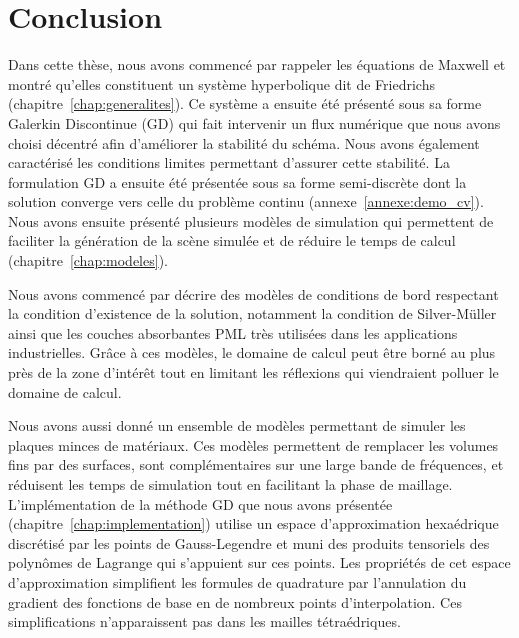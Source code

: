 \chapter*{Conclusion}


Dans cette thèse, nous avons commencé par rappeler
les équations de Maxwell et montré qu’elles constituent un système
hyperbolique dit de Friedrichs (chapitre~\ref{chap:generalites}).
Ce système a ensuite été présenté sous sa forme Galerkin Discontinue (GD)
qui fait intervenir un flux numérique que nous avons choisi décentré
afin d'améliorer la stabilité du schéma.
Nous avons également caractérisé les
conditions limites permettant d’assurer cette stabilité.
La formulation GD a ensuite été présentée sous sa forme semi-discrète
dont la solution converge vers celle du problème continu (annexe~\ref{annexe:demo_cv}).
\\

Nous avons ensuite présenté plusieurs modèles de simulation
qui permettent de faciliter la génération de la scène simulée
et de réduire le temps de calcul (chapitre~\ref{chap:modeles}).

Nous avons commencé par décrire des modèles de conditions de bord
respectant la condition d'existence de la solution, notamment
la condition de Silver-Müller ainsi que les couches absorbantes PML
très utilisées dans les applications industrielles.
Grâce à ces modèles, le domaine de calcul peut être borné
au plus près de la zone d'intérêt tout en limitant les
réflexions qui viendraient polluer le domaine de calcul.

Nous avons aussi donné un ensemble de modèles permettant de simuler
les plaques minces de matériaux. Ces modèles permettent de remplacer
les volumes fins par des surfaces, sont complémentaires sur une
large bande de fréquences, et réduisent les temps de simulation
tout en facilitant la phase de maillage.
\\


L'implémentation de la méthode GD que nous avons présentée
(chapitre~\ref{chap:implementation}) utilise un espace
d'approximation hexaédrique discrétisé par les points de
Gauss-Legendre et muni des produits tensoriels des polynômes de Lagrange
qui s'appuient sur ces points.
Les propriétés de cet espace d'approximation
simplifient les formules de quadrature par l'annulation
du gradient des fonctions de base en de nombreux points d'interpolation.
Ces simplifications n'apparaissent pas dans les mailles tétraédriques.

